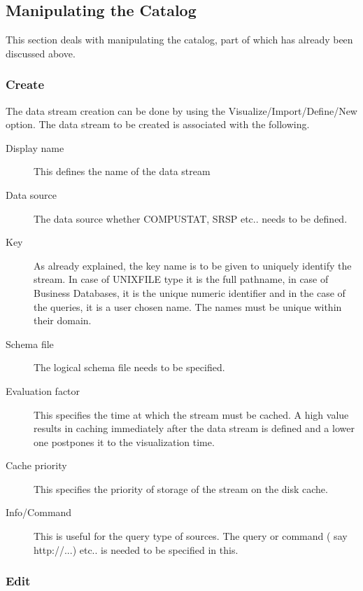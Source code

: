 \subsection{Manipulating the Catalog}

This section deals with manipulating the catalog, part of which has already been discussed above.

\subsubsection{Create}

The data stream creation can be done by using the Visualize/Import/Define/New option.  The data stream to be created is associated with the following.

\begin{description}
\item[Display name] This defines the name of the data stream
\item[Data source] The data source whether COMPUSTAT, SRSP etc.. needs to be defined.
\item[Key] As already explained, the key name is to be given to uniquely identify the stream. In case of UNIXFILE type it is the full pathname, in case of Business Databases, it is the unique numeric identifier and in the case of the queries, it is a user chosen name. The names must be unique within their domain.
\item[Schema file] The logical schema file needs to be specified.
\item[Evaluation factor] This specifies the time at which the stream must be cached. A high value results in caching immediately after the data stream is defined and a lower one postpones it to the visualization time.
\item[Cache priority] This specifies the priority of storage of the stream on the disk cache.
\item[Info/Command] This is useful for the query type of sources. The query or command ( say http://...) etc.. is needed to be specified in this.
\end{description}


\subsubsection{Edit}

